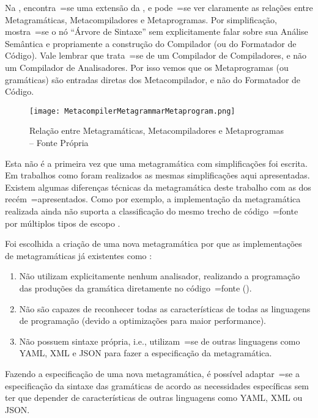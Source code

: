 Na ,
encontra~=se uma extensão da ,
e pode~=se ver claramente as relações entre Metagramáticas,
Metacompiladores e Metaprogramas. Por simplificação,
mostra~=se o nó ``Árvore de Sintaxe'' sem explicitamente falar sobre sua Análise Semântica e
propriamente a construção do Compilador (ou do Formatador de Código).
Vale lembrar que trata~=se de um Compilador de Compiladores,
e não um Compilador de Analisadores.
Por isso vemos que os Metaprogramas (ou gramáticas) são entradas diretas dos Metacompilador,
e não do Formatador de Código.
\begin{figure}[h]
\centering
\texttt{[image: MetacompilerMetagrammarMetaprogram.png]}
\caption[Relação entre Metagramáticas, Metacompiladores e Metaprogramas]{Relação entre Metagramáticas, Metacompiladores e Metaprogramas -- Fonte Própria \cite{larkErrorRecovery}}
\label{MetacompilerMetagrammarMetaprogram}
\end{figure}

Esta não é a primeira vez que uma metagramática com simplificações foi escrita.
Em trabalhos como  foram realizados as mesmas simplificações aqui apresentadas.
Existem algumas diferenças técnicas da metagramática deste trabalho com as dos recém~=apresentados.
Como por exemplo,
a implementação da metagramática realizada ainda não suporta a classificação do mesmo trecho de código~=fonte por múltiplos tipos de escopo \cite{vsCodeSyntaxHighlighthing}.

Foi escolhida a criação de uma nova metagramática por que as implementações de metagramáticas já existentes como :
\begin{enumerate}[1)]
\item Não utilizam explicitamente nenhum analisador,
realizando a programação das produções da gramática diretamente no código~=fonte ().
\item Não são capazes de reconhecer todas as características de todas as linguagens de programação (devido a optimizações para maior performance).
\item Não possuem sintaxe própria,
i.e.,
utilizam~=se de outras linguagens como YAML,
XML e
JSON para fazer a especificação da metagramática.
\end{enumerate}
Fazendo a especificação de uma nova metagramática,
é possível adaptar~=se a especificação da sintaxe das gramáticas de acordo as necessidades específicas sem ter que depender de características de outras linguagens como YAML,
XML ou
JSON.


